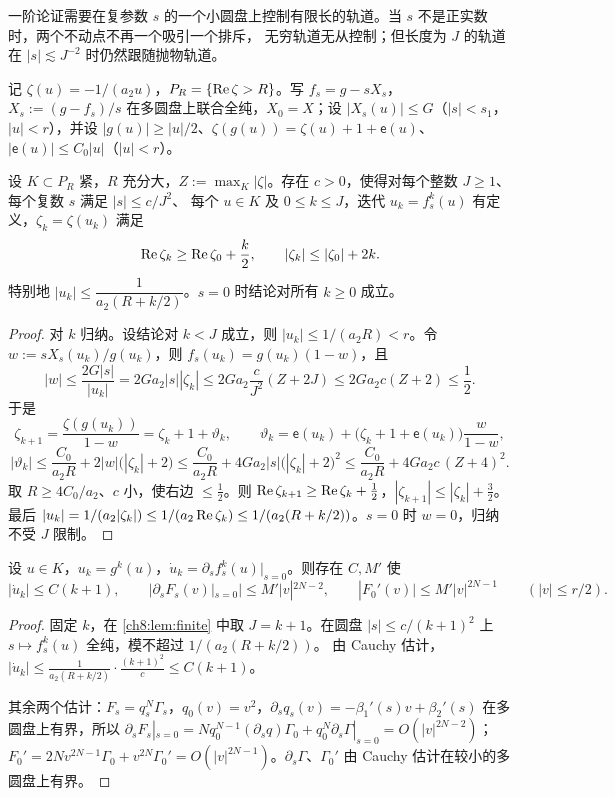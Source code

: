 一阶论证需要在复参数 $s$ 的一个小圆盘上控制有限长的轨道。当 $s$ 不是正实数时，两个不动点不再一个吸引一个排斥，
无穷轨道无从控制；但长度为 $J$ 的轨道在 $|s|\lesssim J^{-2}$ 时仍然跟随抛物轨道。

记 $\zeta(u)=-1/(a_2u)$，$P_R=\{\operatorname{Re}\zeta>R\}$。写 $f_s=g-sX_s$，$X_s:=(g-f_s)/s$ 在多圆盘上联合全纯，$X_0=X$；设
$|X_s(u)|\le G$（$|s|<s_1$，$|u|<r$），并设 $|g(u)|\ge|u|/2$、$\zeta(g(u))=\zeta(u)+1+\mathsf e(u)$、$|\mathsf e(u)|\le C_0|u|$（$|u|<r$）。

\begin{lemma}[有限轨道]\label{ch8:lem:finite}
设 $K\subset P_R$ 紧，$R$ 充分大，$Z:=\max_K|\zeta|$。存在 $c>0$，使得对每个整数 $J\ge1$、每个复数 $s$ 满足 $|s|\le c/J^2$、
每个 $u\in K$ 及 $0\le k\le J$，迭代 $u_k=f_s^k(u)$ 有定义，$\zeta_k=\zeta(u_k)$ 满足
\[
 \operatorname{Re}\zeta_k\ge\operatorname{Re}\zeta_0+\frac k2,\qquad |\zeta_k|\le|\zeta_0|+2k .
\]
特别地 $|u_k|\le\dfrac1{a_2(R+k/2)}$。$s=0$ 时结论对所有 $k\ge0$ 成立。
\end{lemma}

\begin{proof}
对 $k$ 归纳。设结论对 $k<J$ 成立，则 $|u_k|\le1/(a_2R)<r$。令 $w:=sX_s(u_k)/g(u_k)$，则 $f_s(u_k)=g(u_k)(1-w)$，且
\[
 |w|\le\frac{2G|s|}{|u_k|}=2Ga_2|s||\zeta_k|\le2Ga_2\frac{c}{J^2}(Z+2J)\le2Ga_2c(Z+2)\le\frac12 .
\]
于是
\[
 \zeta_{k+1}=\frac{\zeta(g(u_k))}{1-w}=\zeta_k+1+\vartheta_k,\qquad
 \vartheta_k=\mathsf e(u_k)+\bigl(\zeta_k+1+\mathsf e(u_k)\bigr)\frac{w}{1-w},
\]
\[
 |\vartheta_k|\le\frac{C_0}{a_2R}+2|w|\bigl(|\zeta_k|+2\bigr)\le\frac{C_0}{a_2R}+4Ga_2|s|\bigl(|\zeta_k|+2\bigr)^2
 \le\frac{C_0}{a_2R}+4Ga_2c\,(Z+4)^2 .
\]
取 $R\ge4C_0/a_2$、$c$ 小，使右边 $\le\frac12$。则 $\operatorname{Re}\zeta_{k+1}\ge\operatorname{Re}\zeta_k+\frac12$，$|\zeta_{k+1}|\le|\zeta_k|+\frac32$。
最后 $|u_k|=1/(a_2|\zeta_k|)\le1/(a_2\operatorname{Re}\zeta_k)\le1/(a_2(R+k/2))$。$s=0$ 时 $w=0$，归纳不受 $J$ 限制。
\end{proof}

\begin{lemma}[导数估计]\label{ch8:lem:derbounds}
设 $u\in K$，$u_k=g^k(u)$，$\dot u_k=\partial_sf_s^k(u)|_{s=0}$。则存在 $C,M'$ 使
\[
 |\dot u_k|\le C(k+1),\qquad \bigl|\partial_sF_s(v)|_{s=0}\bigr|\le M'|v|^{2N-2},\qquad |F_0'(v)|\le M'|v|^{2N-1}\qquad(|v|\le r/2).
\]
\end{lemma}

\begin{proof}
固定 $k$，在 \cref{ch8:lem:finite} 中取 $J=k+1$。在圆盘 $|s|\le c/(k+1)^2$ 上 $s\mapsto f_s^k(u)$ 全纯，模不超过 $1/(a_2(R+k/2))$。
由 Cauchy 估计，$|\dot u_k|\le\frac{1}{a_2(R+k/2)}\cdot\frac{(k+1)^2}{c}\le C(k+1)$。

其余两个估计：$F_s=q_s^N\Gamma_s$，$q_0(v)=v^2$，$\partial_sq_s(v)=-\beta_1'(s)v+\beta_2'(s)$ 在多圆盘上有界，所以
$\partial_sF_s|_{s=0}=Nq_0^{N-1}(\partial_sq)\Gamma_0+q_0^N\partial_s\Gamma|_{s=0}=O(|v|^{2N-2})$；
$F_0'=2Nv^{2N-1}\Gamma_0+v^{2N}\Gamma_0'=O(|v|^{2N-1})$。$\partial_s\Gamma$、$\Gamma_0'$ 由 Cauchy 估计在较小的多圆盘上有界。
\end{proof}

